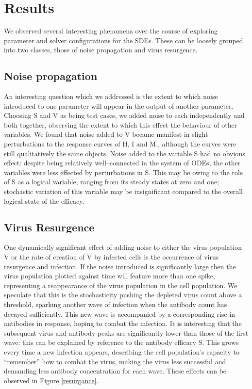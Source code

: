\documentclass[a4paper, 12pt]{report}
\begin{document}
\section{Results}

We observed several interesting phenomena over the course of exploring parameter and solver configurations for the SDEs. These can be loosely grouped into two classes, those of noise propagation and virus resurgence.

\subsection{Noise propagation}

An interesting question which we addressed is the extent to which noise introduced to one parameter will appear in the output of another parameter. Choosing S and V as being test cases, we added noise to each independently and both together, observing the extent to which this effect the behaviour of other variables. We found that noise added to V became manifest in slight perturbations to the response curves of H, I and M., although the curves were still qualitatively the same objects. Noise added to the variable S had no obvious effect: despite being relatively well--connected in the system of ODEs, the other variables were less effected by perturbations in S. This may be owing to the role of S as a logical variable, ranging from its steady states at zero and one; stochastic variation of this variable may be insignificant compared to the overall logical state of the efficacy.

\subsection{Virus Resurgence}

One dynamically significant effect of adding noise to either the virus population V or the rate of creation of V by infected cells is the occurrence of virus resurgence and infection. If the noise introduced is significantly large then the virus population plotted against time will feature more than one spike, representing a reappearance of the virus population in the cell population. We speculate that this is the stochasticity pushing the depleted virus count above a threshold, sparking another wave of infection when the antibody count has decayed sufficiently. This new wave is accompanied by a corresponding rise in antibodies in response, hoping to combat the infection. It is interesting that the subsequent virus and antibody peaks are significantly lower than those of the first wave: this can be explained by reference to the antibody efficacy S. This grows every time a new infection appears, describing the cell population's capacity to ``remember'' how to combat the virus, making the virus less successful and demanding less antibody concentration for each wave. These effects can be observed in Figure \ref{resurgance}.
\end{document}

